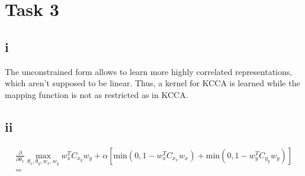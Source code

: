 \section*{Task 3}

\subsection*{i}
The unconstrained form allows to learn more highly correlated representations, which aren't supposed to be linear.
Thus, a kernel for KCCA is learned while the mapping function is not as restricted as in KCCA.

\subsection*{ii}
\begin{gather*}
  \frac{\partial}{\partial \theta _x} \max_{\theta _x, \theta _y, w_x, w_y} w_x^T C_x_y w_y + \alpha [\text{min} (0, 1 - w_x^T C_x_x w_x) + \text{min}(0, 1 - w_y^T C_y_y w_y)] \\
  =
\end{gather*}
